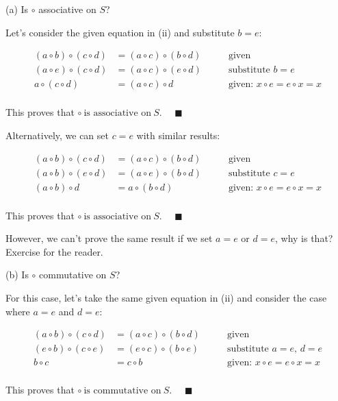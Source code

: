 (a) Is $\circ$ associative on $S$?

Let's consider the given equation in (ii) and substitute $b = e$:

$$
\begin{aligned}
(a \circ b) \circ (c \circ d) & = (a \circ c) \circ (b \circ d) & \qquad \textrm{given} \\
(a \circ e) \circ (c \circ d) & = (a \circ c) \circ (e \circ d) & \qquad \textrm{substitute $b = e$} \\
a \circ (c \circ d) & = (a \circ c) \circ d & \qquad \textrm{given: $x \circ e = e \circ x = x$} \\
\end{aligned}
$$

This proves that $\boxed{\circ\ \text{is associative on} \ S.}$ $\quad \blacksquare$

Alternatively, we can set $c = e$ with similar results:

$$
\begin{aligned}
(a \circ b) \circ (c \circ d) & = (a \circ c) \circ (b \circ d) & \qquad \textrm{given} \\
(a \circ b) \circ (e \circ d) & = (a \circ e) \circ (b \circ d) & \qquad \textrm{substitute $c = e$} \\
(a \circ b) \circ d & = a \circ (b \circ d) & \qquad \textrm{given: $x \circ e = e \circ x = x$} \\
\end{aligned}
$$

This proves that $\boxed{\circ \ \text{is associative on} \ S.}$ $\quad \blacksquare$

However, we can't prove the same result if we set $a = e$ or $d = e$, why is
that? Exercise for the reader.

(b) Is $\circ$ commutative on $S$?

For this case, let's take the same given equation in (ii) and consider the case
where $a = e$ and $d = e$:

$$
\begin{aligned}
(a \circ b) \circ (c \circ d) & = (a \circ c) \circ (b \circ d) & \qquad \textrm{given} \\
(e \circ b) \circ (c \circ e) & = (e \circ c) \circ (b \circ e) &
    \qquad \textrm{substitute $a = e$, $d = e$} \\
b \circ c & = c \circ b & \qquad \textrm{given: $x \circ e = e \circ x = x$} \\
\end{aligned}
$$

This proves that $\boxed{\circ \ \text{is commutative on} \ S.}$ $\quad \blacksquare$
